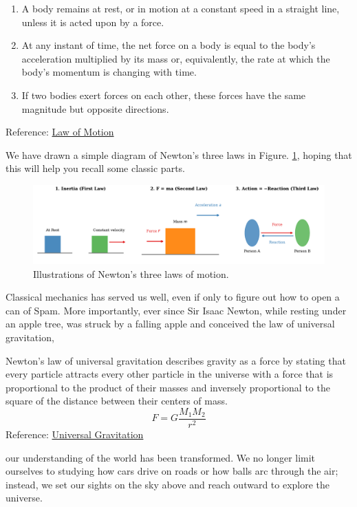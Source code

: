 \documentclass[12pt,oneside]{book}
\begin{document}
\begin{bluebox}
  \begin{enumerate}
    \item A body remains at rest, or in motion at a constant speed in a straight line, unless it is acted upon by a force.
    \item At any instant of time, the net force on a body is equal to the body's acceleration multiplied by its mass or, equivalently, the rate at which the body's momentum is changing with time.
    \item If two bodies exert forces on each other, these forces have the same magnitude but opposite directions.
  \end{enumerate}
  Reference: \href{https://en.wikipedia.org/wiki/Newton%27s_laws_of_motion}{Law of Motion}
\end{bluebox}

We have drawn a simple diagram of Newton's three laws in Figure. \ref{fig:newton}, hoping that this will help you recall some classic parts.


\begin{figure}[htbp]
    \centering
    \includegraphics[width=1\linewidth]{newton_three_laws_nature_style_v3.pdf}
    \caption{Illustrations of Newton's three laws of motion.}
    \label{fig:newton}
\end{figure}

Classical mechanics has served us well, even if only to figure out how to open a can of Spam. More importantly, ever since Sir Isaac Newton, while resting under an apple tree, was struck by a falling apple and conceived the law of universal gravitation, 
\begin{bluebox}
  Newton's law of universal gravitation describes gravity as a force by stating that every particle attracts every other particle in the universe with a force that is proportional to the product of their masses and inversely proportional to the square of the distance between their centers of mass.
  \begin{equation*}
    F = G \frac{M_{1}M_{2}}{r^2}
  \end{equation*}
  Reference: \href{https://en.wikipedia.org/wiki/Newton%27s_law_of_universal_gravitation}{Universal Gravitation}
\end{bluebox}
our understanding of the world has been transformed. We no longer limit ourselves to studying how cars drive on roads or how balls arc through the air; instead, we set our sights on the sky above and reach outward to explore the universe.
\end{document}
